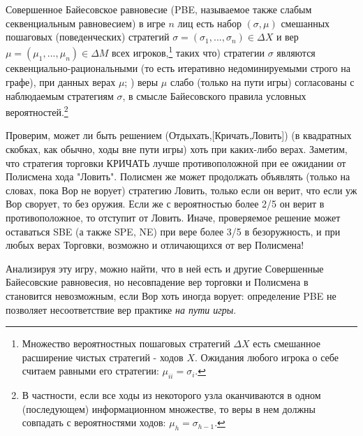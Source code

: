 \documentclass[a4paper,12pt]{article}
\begin{document}
\begin{exmp}
\begin{defn}{\rm
Совершенное Байесовское равновесие (PBE, называемое также
слабым секвенциальным равновесием) в игре $n$ лиц есть
набор $(\sigma,\mu)$ смешанных пошаговых (поведенческих)
стратегий $\sigma=(\sigma_1,...,\sigma_n)\in \Delta X$   и
вер $\mu=(\mu_1,...,\mu_n)\in \Delta M$
всех игроков,\footnote{Множество вероятностных пошаговых
стратегий $\Delta X$ есть смешанное расширение чистых
стратегий - ходов $X$. Ожидания любого игрока о себе
считаем равными его стратегии: $\mu_{ii}=\sigma_i$.}
таких что) стратегии $\sigma$ являются
секвенциально-рациональными (то есть итеративно
недоминируемыми строго на графе), при данных верах
$\mu$;
) веры $\mu$ слабо (только на пути
игры) согласованы с наблюдаемым стратегиям $\sigma$, в
смысле Байесовского правила условных
вероятностей.\footnote{ В частности, если все ходы из
некоторого узла оканчиваются в одном (последующем)
информационном множестве, то веры в нем должны совпадать с
вероятностями ходов: $\mu_{h}=\sigma_{h-1}$.} }\end{defn}

Проверим,  может ли быть решением
(Отдыхать,[Кричать,Ловить]) (в квадратных скобках, как
обычно, ходы вне пути игры) хоть при каких-либо верах.
Заметим, что стратегия торговки КРИЧАТЬ лучше
противоположной при ее ожидании от Полисмена хода "Ловить".
Полисмен же может продолжать объявлять (только на словах,
пока Вор не ворует) стратегию Ловить, только если он верит,
что если уж Вор сворует, то без оружия. Если же с
вероятностью более 2/5 он верит в противоположное, то
отступит от Ловить. Иначе, проверяемое решение может
оставаться SBE (а также SPE, NE) при вере более 3/5 в
безоружность, и при любых верах Торговки, возможно и
отличающихся от вер Полисмена!

Анализируя эту игру, можно найти, что в ней есть и другие
Совершенные Байесовские равновесия, но несовпадение вер
торговки и Полисмена в становится невозможным, если Вор
хоть иногда ворует: определение PBE не позволяет
несоответствие вер практике {\em на пути игры}.
\end{exmp}
\end{document}
